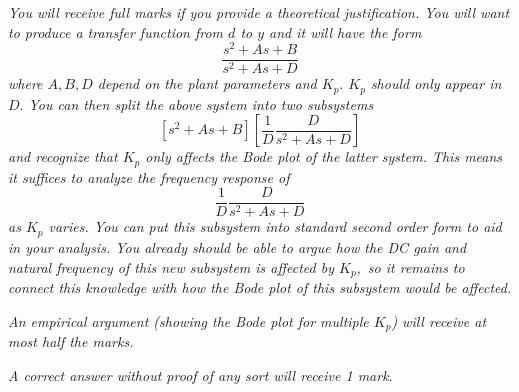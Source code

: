 \begin{deliverable}[label={lab2:report}]
\begin{enumerate}[label={(\arabic*)}]
{      \emph{You will receive full marks if you provide a theoretical
      justification. You will want to produce a transfer function from
      \(d\) to \(y\) and it will have the form
      \[
        \frac{s^2 + A s + B}{s^2 + A s + D}
      \]
      where \(A, B, D\) depend on the plant parameters and \(K_p.\)
      \(K_p\) should only appear in \(D.\) You can then split the
      above system into two subsystems
      \[
        \left[s^2 + A s + B\right]
        \left[\frac{1}{D}\frac{D}{s^2 + A s + D}\right]
      \]
      and recognize that \(K_p\) only affects the Bode plot of the latter
      system. This means it suffices to analyze the frequency response of
      \[
        \frac{1}{D}\frac{D}{s^2 + A s + D}
      \]
      as \(K_p\) varies. You can put this subsystem into standard second order
      form to aid in your analysis. You already should be able to argue how the
      DC gain and natural frequency of this new subsystem is affected by
      \(K_p,\) so it remains to connect this knowledge with how the Bode plot
      of this subsystem would be affected.}

      \emph{An empirical argument (showing the Bode plot for multiple \(K_p\))
      will receive at most half the marks.}

      \emph{A correct answer without proof of any sort will receive 1 mark.}
      \label{lab2:report:q8}
    }
  \end{enumerate}
\end{deliverable}

